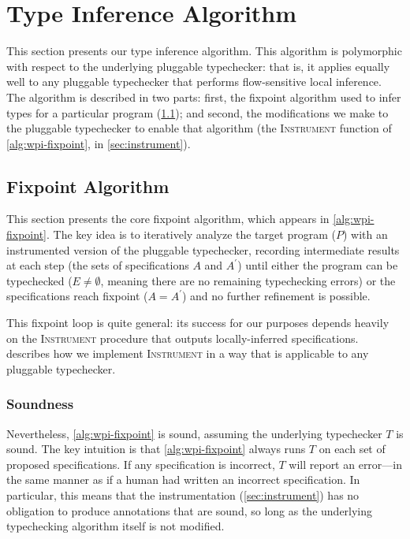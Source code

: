 \section{Type Inference Algorithm}
\label{sec:algorithm}

This section presents our type inference algorithm. This algorithm is
polymorphic with respect to the underlying pluggable typechecker: that is,
it applies equally well to any pluggable typechecker that performs flow-sensitive
local inference. The algorithm is described in two parts: first, the fixpoint
algorithm used to infer types for a particular program (\cref{sec:core-algorithm});
and second, the modifications we make to the pluggable typechecker to enable
that algorithm (\ie the \textsc{Instrument} function of \cref{alg:wpi-fixpoint},
in \cref{sec:instrument}).

\subsection{Fixpoint Algorithm}
\label{sec:core-algorithm}



This section presents the core fixpoint algorithm, which appears
in \cref{alg:wpi-fixpoint}. The key idea is to iteratively analyze
the target program ($P$) with an instrumented version of the
pluggable typechecker, recording intermediate results at each
step (the sets of specifications $A$ and $A^{\prime}$) until
either the program can be typechecked (\ie $E \neq \emptyset$,
meaning there are no remaining typechecking errors) or the
specifications reach fixpoint (\ie $A = A^{\prime}$) and
no further refinement is possible.

This fixpoint loop is quite general: its success for our
purposes depends heavily on the \textsc{Instrument} procedure
that outputs locally-inferred specifications. 
describes how we implement \textsc{Instrument} in a way that is
applicable to any pluggable typechecker.

\subsubsection{Soundness}
\label{sec:soundness}

Nevertheless, \cref{alg:wpi-fixpoint} is sound, assuming the underlying typechecker $T$
is sound. The key intuition is that \cref{alg:wpi-fixpoint} always runs $T$
on each set of proposed specifications. If any specification is incorrect,
$T$ will report an error---in the same manner as if a human had written an
incorrect specification. In particular, this means that the instrumentation
(\cref{sec:instrument}) has no obligation to produce annotations that are sound,
so long as the underlying typechecking algorithm itself is not modified.

